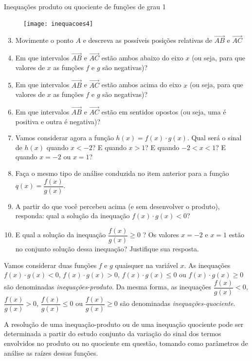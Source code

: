 \begin{task}{Inequações produto ou quociente de funções de grau 1}
\begin{figure}[H]
\centering

\texttt{[image: inequacoes4]}
\end{figure}

\begin{enumerate}\setcounter{enumi}{2}
\item Movimente o ponto $A$ e descreva as possíveis posições relativas de $\overrightarrow{AB}$ e $\overrightarrow{AC}$
\item Em que intervalos $\overrightarrow{AB}$ e $\overrightarrow{AC}$ estão ambos abaixo do eixo $x$ (ou seja, para que valores de $x$ as funções $f$ e $g$ são negativas)?
\item Em que intervalos $\overrightarrow{AB}$ e $\overrightarrow{AC}$ estão ambos acima do eixo $x$ (ou seja, para que valores de $x$ as funções $f$ e $g$ são negativas)?
\item Em que intervalos $\overrightarrow{AB}$ e $\overrightarrow{AC}$ estão em sentidos opostos (ou seja, uma é positiva e outra é negativa)?
\item Vamos considerar agora a função $h(x) = f(x) \cdot g(x)$. Qual será o sinal de $h(x)$ quando $x < - 2$? E quando $x > 1$? E quando $-2 < x < 1$? E quando $x = -2$ ou $x = 1$? 
\item Faça o mesmo tipo de análise conduzida no item anterior para a função $q(x)=\dfrac{f(x)}{g(x)}$. 
\item A partir do que você percebeu acima (e sem desenvolver o produto), responda: qual a solução da inequação $f(x)\cdot g(x)<0$?
\item E qual a solução da inequação $\dfrac{f(x)}{g(x)}\geq0$ ? Os valores $x=-2$ e $x=1$ estão no conjunto solução dessa inequação? Justifique sua resposta.
\end{enumerate}
\end{task}


Vamos considerar duas funções $f$ e $g$ quaisquer na variável $x$. As inequações $f(x)\cdot g(x)<0$, $f(x)\cdot g(x)>0$, $f(x)\cdot g(x)\leq0$ ou $f(x)\cdot g(x)\geq0$ são denominadas \textit{inequações-produto}. Da mesma forma, as inequações $\dfrac{f(x)}{g(x)}<0$, $\dfrac{f(x)}{g(x)}>0$, $\dfrac{f(x)}{g(x)}\leq0$ ou $\dfrac{f(x)}{g(x)}\geq0$ são denominadas \textit{inequações-quociente}.

A resolução de uma inequação-produto ou de uma inequação quociente pode ser determinada a partir do estudo conjunto da variação do sinal dos termos envolvidos no produto ou no quociente em questão, tomando como parâmetros de análise as raízes dessas funções.

